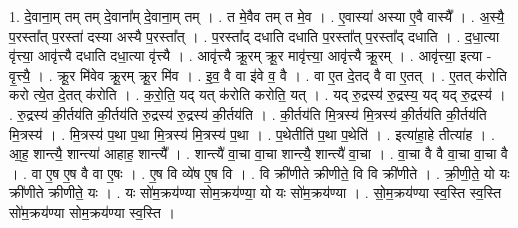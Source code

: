 \documentclass[17pt]{extarticle}
\begin{document}
1. दे॒वाना॒म् तम् तम् दे॒वाना᳚म् दे॒वाना॒म् तम् । . त मे॒वैव तम् त मे॒व । . ए॒वास्या॑ अस्या ए॒वै वास्यै᳚ । . अ॒स्यै॒ प॒रस्ता᳚त् प॒रस्ता॑ दस्या अस्यै प॒रस्ता᳚त् । . प॒रस्ता᳚द् दधाति दधाति प॒रस्ता᳚त् प॒रस्ता᳚द् दधाति । . द॒धा॒त्या वृ॑त्त्या॒ आवृ॑त्त्यै दधाति दधा॒त्या वृ॑त्त्यै । . आवृ॑त्त्यै क्रू॒रम् क्रू॒र मावृ॑त्त्या॒ आवृ॑त्त्यै क्रू॒रम् । . आवृ॑त्त्या॒ इत्या - वृ॒त्त्यै॒ । . क्रू॒र मि॑वेव क्रू॒रम् क्रू॒र मि॑व । . इ॒व॒ वै वा इ॑वे व॒ वै । . वा ए॒त दे॒तद् वै वा ए॒तत् । . ए॒तत् क॑रोति करो त्ये॒त दे॒तत् क॑रोति । . क॒रो॒ति॒ यद् यत् क॑रोति करोति॒ यत् । . यद् रु॒द्रस्य॑ रु॒द्रस्य॒ यद् यद् रु॒द्रस्य॑ । . रु॒द्रस्य॑ की॒र्तय॑ति की॒र्तय॑ति रु॒द्रस्य॑ रु॒द्रस्य॑ की॒र्तय॑ति । . की॒र्तय॑ति मि॒त्रस्य॑ मि॒त्रस्य॑ की॒र्तय॑ति की॒र्तय॑ति मि॒त्रस्य॑ । . मि॒त्रस्य॑ प॒था प॒था मि॒त्रस्य॑ मि॒त्रस्य॑ प॒था । . प॒थेतीति॑ प॒था प॒थेति॑ । . इत्या॑हा॒हे तीत्या॑ह । . आ॒ह॒ शान्त्यै॒ शान्त्या॑ आहाह॒ शान्त्यै᳚ । . शान्त्यै॑ वा॒चा वा॒चा शान्त्यै॒ शान्त्यै॑ वा॒चा । . वा॒चा वै वै वा॒चा वा॒चा वै । . वा ए॒ष ए॒ष वै वा ए॒षः । . ए॒ष वि व्ये॑ष ए॒ष वि । . वि क्री॑णीते क्रीणीते॒ वि वि क्री॑णीते । . क्री॒णी॒ते॒ यो यः क्री॑णीते क्रीणीते॒ यः । . यः सो॑म॒क्रय॑ण्या सोम॒क्रय॑ण्या॒ यो यः सो॑म॒क्रय॑ण्या । . सो॒म॒क्रय॑ण्या स्व॒स्ति स्व॒स्ति सो॑म॒क्रय॑ण्या सोम॒क्रय॑ण्या स्व॒स्ति । \newline
\end{document}
